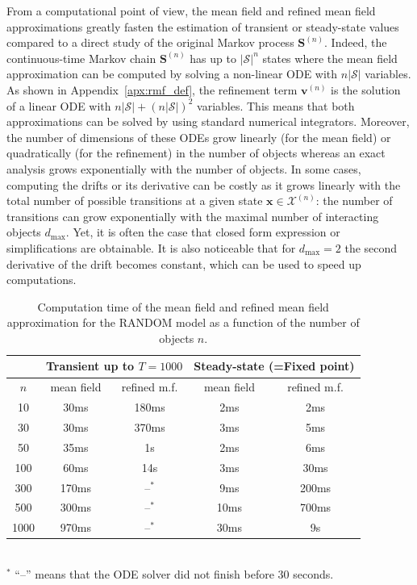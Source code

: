 \documentclass[acmsmall]{acmart}
\newcommand\bx{\mathbf{x}}
\newcommand\bS{\mathbf{S}}
\newcommand\bv{\mathbf{v}}
\newcommand\calX{\mathcal{X}}
\newcommand\calS{\mathcal{S}}
\newcommand\toN{^{(n)}}
\newcommand\bSn{\bS\toN}
\begin{document}
From a computational point of view, the mean field and refined mean field approximations greatly fasten the estimation of transient or steady-state values compared to a direct study of the original Markov process $\bSn$. Indeed, the continuous-time Markov chain $\bSn$ has up to $|\calS|^n$ states where the mean field approximation can be computed by solving a non-linear ODE with $n|\calS|$ variables. As shown in Appendix~\ref{apx:rmf_def}, the refinement term $\bv\toN$ is the solution of a linear ODE with $n|\calS|+(n|\calS|)^2$ variables. This means that both approximations can be solved by using standard numerical integrators. \color{neworange} Moreover, the number of dimensions of these ODEs grow linearly (for the mean field) or quadratically (for the refinement) in the number of objects whereas an exact analysis grows exponentially with the number of objects. In some cases, computing the drifts or its derivative can be costly as it grows linearly with the total number of possible transitions at a given state $\bx \in \calX\toN$: the number of transitions can grow exponentially with the maximal number of interacting objects $d_{\max}$. Yet, it is often the case that closed form expression or simplifications are obtainable. It is also noticeable that for $d_{\max}=2$ the second derivative of the drift becomes constant, which can be used to speed up computations. \color{black}

\begin{table}[ht]
  \caption{Computation time of the mean field and refined mean field approximation for the RANDOM model as a function of the number of objects $n$.}
  \label{table:computation_time_random}
  \begin{tabular}{|c|c|c|c|c|}
    \hline
    &  \multicolumn{2}{c|}{Transient up to $T=1000$}
    & \multicolumn{2}{c|}{Steady-state (=Fixed point)}\\\hline
    $n$& mean field & refined m.f. & mean field & refined m.f.\\\hline
    10 & 30ms &180ms& 2ms &2ms\\\hline
    30 & 30ms &370ms& 3ms &5ms\\\hline
    50 & 35ms &1s& 2ms &6ms\\\hline
    100 & 60ms &14s& 3ms &30ms\\\hline
    300 & 170ms &--$^*$& 9ms &200ms\\\hline
    500 & 300ms &--$^*$& 10ms &700ms\\\hline
    1000 & 970ms &--$^*$& 30ms &9s\\\hline
  \end{tabular}\\
  ${}^*$ ``--'' means that the ODE solver did not finish before 30 seconds. 
\end{table}
\end{document}
